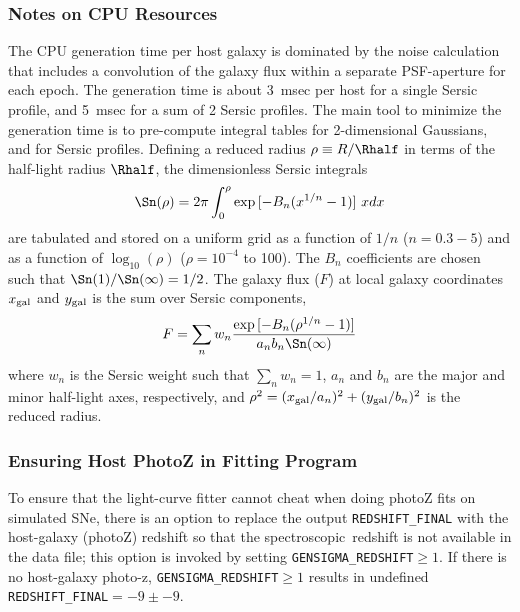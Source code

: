 \documentclass[12pt]{article}
\newcommand{\spec}{spectroscopic}
\begin{document}
{%
\subsubsection{Notes on CPU Resources}
\label{sss:hostlib_CPU}

The CPU generation time per host galaxy is dominated by the 
noise calculation that includes a convolution of the galaxy 
flux within a separate PSF-aperture for each epoch.  
The generation time is about 3~msec per host for a 
single Sersic profile, and 5~msec for a sum of 2 Sersic profiles.
The main tool to minimize the generation  time is to pre-compute
integral tables for 2-dimensional Gaussians,
and for Sersic profiles. 
Defining a reduced radius $\rho \equiv R/\Rhalf$ in terms
of the half-light radius $\Rhalf$,
the dimensionless Sersic integrals
%
\begin{equation}
  \Sn(\rho) = 2\pi\int_0^\rho  \exp{[-B_n (x^{1/n} -1)]}~ x dx 
\end{equation}
%
are tabulated and stored on a uniform grid as a function of
$1/n$ ($n=0.3 - 5$) and as a function of $\log_{10}(\rho)$
($\rho=10^{-4}$ to 100).  The $B_n$ coefficients are chosen
such that $\Sn(1)/\Sn(\infty) = 1/2$.
The galaxy flux ($F$) at local galaxy coordinates
$x_{\rm gal}$ and $y_{\rm gal}$
is the sum over Sersic components,
\begin{equation}
   F = \sum_n w_n \frac{ \exp{ [-B_n (\rho^{1/n}-1)] } }{a_n b_n\Sn(\infty)} 
\end{equation}
where $w_n$ is the Sersic weight such that $\sum_n w_n=1$,
$a_n$ and $b_n$ are the major and minor half-light axes, 
respectively, and 
$\rho^2 = (x_{\rm gal}/a_n)^2 + (y_{\rm gal}/b_n)^2$
is the reduced radius.



\subsubsection{Ensuring Host PhotoZ in Fitting Program}
\label{sss:hostlib_photoz}

To ensure that the light-curve fitter cannot cheat when doing
photoZ fits on simulated SNe, there is an option to replace the 
output {\tt REDSHIFT\_FINAL} with the host-galaxy (photoZ) redshift
so that the \spec\ redshift is not available in the data file;
this option is invoked by setting {\tt GENSIGMA\_REDSHIFT}$\ge 1$.
If there is no host-galaxy photo-z, {\tt GENSIGMA\_REDSHIFT}$\ge 1$
results in undefined {\tt REDSHIFT\_FINAL}$= -9 \pm -9$.


}
\end{document}
